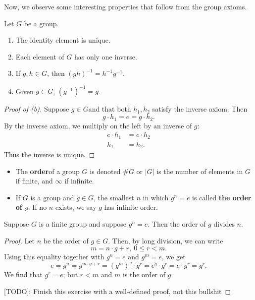 \documentclass[math1530-lecture-notes]{subfiles}
\begin{document}
Now, we observe some interesting properties that follow from the group axioms.
\begin{proposition}{}
  Let $G$ be a group.
  \begin{enumerate}
    \item The identity element is unique.
    \item Each element of $G$ has only one inverse.
    \item If $g,h\in G$, then $(gh)^{-1}=h^{-1}g^{-1}$.
    \item Given $g\in G$, $(g^{-1})^{-1}=g$.
  \end{enumerate}
\end{proposition}
\begin{proof}[Proof of (b)]
  Suppose $g\in G$and that both $h_1,h_2$ satisfy the inverse axiom. Then \[
  g\cdot h_1=e=g\cdot h_2
  .\]  By the inverse axiom, we multiply on the left by an inverse of $g $:
  \begin{align*}
    e\cdot h_1&= e\cdot h_2 \\
    h_1&=h_2
  .\end{align*} Thus the inverse is unique.
\end{proof}

\begin{definition}[Order]{}
  \begin{itemize}
    \item The \textbf{order}of a group $G$ is denoted  $\#G$ or  $\left| G \right| $ is the number of
          elements in $G$ if finite, and $\infty$ if infinite.
    \item If $G$ is a group and $g\in G$, the smallest $n$ in which $g^{n}=e$ is called \textbf{the
      order of $g$}. If no $n$ exists, we say $g$ has infinite order.
  \end{itemize}
\end{definition}

\begin{proposition}{}
  Suppose $G$ is a finite group and suppose $g^{n}=e$. Then the order of $g$ divides $n$.
\end{proposition}
\begin{proof}[Proof]
  Let $n$ be the order of $g\in G$. Then, by long division, we can write \[
 m=n\cdot g+r,~0\le r<m
  .\]  Using this equality together with $g^{n}=e$ and $g^{m}=e$, we get \[
  e=g^{n}=g^{m\cdot q+r}=\left( g^{m} \right) ^{q}\cdot g^{r} =e^{q}\cdot g^{r}=e\cdot g^{r}=g^{r}
.\] We find that $g^{r}=e$; but $r<m$ and  $m$ is the order of $g$.

[TODO]: Finish this exercise with a well-defined proof, not this bullshit
\end{proof}
\end{document}
